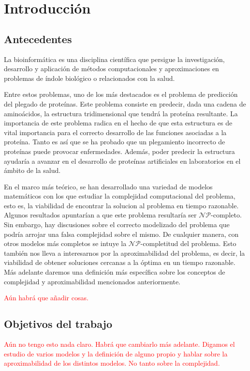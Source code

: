 \chapter{Introducción}
\label{cap:introduccion}

\section{Antecedentes}
La bioinformática es una disciplina científica que persigue la investigación, desarrollo y aplicación de métodos computacionales y aproximaciones en problemas de índole biológico o relacionados con la salud.

Entre estos problemas, uno de los más destacados es el problema de predicción del plegado de proteínas. Este problema consiste en predecir, dada una cadena de aminoácidos, la estructura tridimensional que tendrá la proteína resultante. La importancia de este problema radica en el hecho de que esta estructura es de vital importancia para el correcto desarrollo de las funciones asociadas a la proteína. Tanto es así que se ha probado que un plegamiento incorrecto de proteínas puede provocar enfermedades. Además, poder predecir la estructura ayudaría a avanzar en el desarrollo de proteínas artificiales en laboratorios en el ámbito de la salud.

En el marco más teórico, se han desarrollado una variedad de modelos matemáticos con los que estudiar la complejidad computacional del problema, esto es, la viabilidad de encontrar la solucion al problema en tiempo razonable. Algunos resultados apuntarían a que este problema resultaría ser $\mathcal{NP}$-completo. Sin embargo, hay discusiones sobre el correcto modelizado del problema que podría arrojar una falsa complejidad sobre el mismo. De cualquier manera, con otros modelos más completos se intuye la $\mathcal{NP}$-completitud del problema. Esto también nos lleva a interesarnos por la aproximabilidad del problema, es decir, la viabilidad de obtener soluciones cercanas a la óptima en un tiempo razonable. Más adelante daremos una definición más específica sobre los conceptos de complejidad y aproximabilidad mencionados anteriormente.

\textcolor{red}{Aún habrá que añadir cosas.}

\newpage

\section{Objetivos del trabajo}
\textcolor{red}{Aún no tengo esto nada claro. Habrá que cambiarlo más adelante. Digamos el estudio de varios modelos y la definición de alguno propio y hablar sobre la aproximabilidad de los distintos modelos. No tanto sobre la complejidad.}

